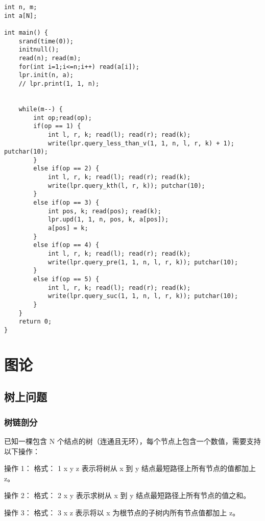\documentclass[UTF8]{ctexart}
\begin{document}
\begin{framed}
\begin{lstlisting}
int n, m;
int a[N];

int main() {
    srand(time(0));
    initnull();
    read(n); read(m);
    for(int i=1;i<=n;i++) read(a[i]);
    lpr.init(n, a);
    // lpr.print(1, 1, n);


    while(m--) {
        int op;read(op);
        if(op == 1) {
            int l, r, k; read(l); read(r); read(k);
            write(lpr.query_less_than_v(1, 1, n, l, r, k) + 1); putchar(10);
        }
        else if(op == 2) {
            int l, r, k; read(l); read(r); read(k);
            write(lpr.query_kth(l, r, k)); putchar(10);
        }
        else if(op == 3) {
            int pos, k; read(pos); read(k);
            lpr.upd(1, 1, n, pos, k, a[pos]);
            a[pos] = k;
        }
        else if(op == 4) {
            int l, r, k; read(l); read(r); read(k);
            write(lpr.query_pre(1, 1, n, l, r, k)); putchar(10);
        }
        else if(op == 5) {
            int l, r, k; read(l); read(r); read(k);
            write(lpr.query_suc(1, 1, n, l, r, k)); putchar(10);
        }
    }
    return 0;
}
\end{lstlisting}
\end{framed}

\newpage
\section{图论}
\subsection{树上问题}
\subsubsection{树链剖分}
已知一棵包含 N 个结点的树（连通且无环），每个节点上包含一个数值，需要支持以下操作：

操作 1： 格式： 1 x y z 表示将树从 x 到 y 结点最短路径上所有节点的值都加上 z。

操作 2： 格式： 2 x y 表示求树从 x 到 y 结点最短路径上所有节点的值之和。

操作 3： 格式： 3 x z 表示将以 x 为根节点的子树内所有节点值都加上 z。
\end{document}
